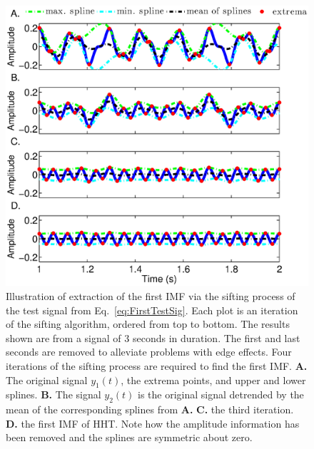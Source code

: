 \documentclass[journal,11pt,a4paper,onecolumn,draftcls]{IEEEtran}
\begin{document}
\begin{figure}
\begin{center}
 \includegraphics[scale=0.42]{./Figures/HHTDemo.eps}
 \caption[HHTDemo]{Illustration of extraction of the first IMF via the sifting process of the test signal from Eq.~\ref{eq:FirstTestSig}. Each plot is an iteration of the sifting algorithm, ordered from top to bottom. The results shown are from a signal of 3 seconds in duration. The first and last seconds are removed to alleviate problems with edge effects. Four iterations of the sifting process are required to find the first IMF. \textbf{A.} The original signal $y_1(t)$, the extrema points, and upper and lower splines. \textbf{B.} The signal $y_2(t)$ is the original signal detrended by the mean of the corresponding splines from \textbf{A.} \textbf{C.} the third iteration. \textbf{D.} the first IMF of HHT. Note how the amplitude information has been removed and the splines are symmetric about zero.}
\label{fig:HHTDemo}
\end{center}
\end{figure}
\end{document}

